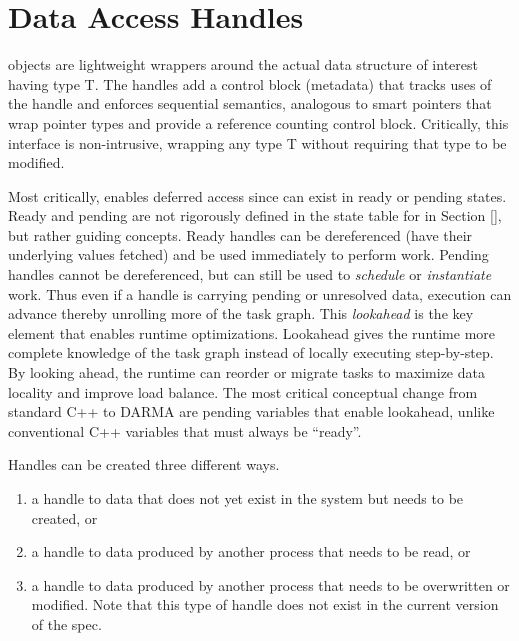 

\section{Data Access Handles}
\label{sec:handles}
 objects are lightweight wrappers around the actual data structure of interest having type T. 
The handles add a control block (metadata) that tracks uses of the handle and enforces
\gls{sequential semantics}, analogous to smart pointers that wrap pointer types and provide a reference counting control block.
Critically, this interface is non-intrusive, wrapping any type T without requiring that type to be modified.

Most critically, \ahandle enables deferred access since \ahandle can exist in ready or pending states. 
Ready and pending are not rigorously defined in the state table for \ahandle in Section \ref{},
but rather guiding concepts.
Ready handles can be dereferenced (have their underlying values fetched) and be used immediately to perform work.
Pending handles cannot be dereferenced, but can still be used to \emph{schedule} or \emph{instantiate} work.
Thus even if a handle is carrying pending or unresolved data, execution can advance thereby unrolling more of the task graph.
This \emph{lookahead} is the key element that enables runtime optimizations.
Lookahead gives the runtime more complete knowledge of the task graph instead of locally executing step-by-step.
By looking ahead, the runtime can reorder or migrate tasks to maximize data locality and improve load balance.
The most critical conceptual change from standard C++ to DARMA are pending variables that enable lookahead, unlike conventional C++ variables that must always be ``ready''.

Handles can be created three different ways.
\begin{enumerate}
\item a handle to data that does not yet exist in the system
but needs to be created, or
\item a handle to data produced by another process that needs to
be read, or 
\item a handle to data produced by another process that needs to be overwritten or modified. 
Note that this type of handle does not exist in the current version of the spec.
\end{enumerate}

